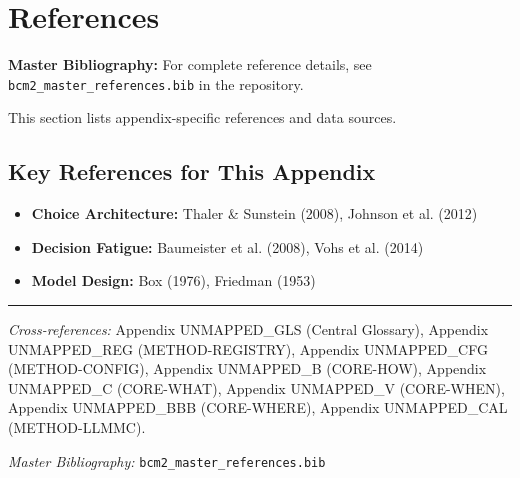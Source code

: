 \section{References}
\label{sec:eee-references}

\begin{tcolorbox}[colback=blue!5!white, colframe=blue!75!black]
\textbf{Master Bibliography:} For complete reference details, see
\texttt{bcm2\_master\_references.bib} in the repository.

This section lists appendix-specific references and data sources.
\end{tcolorbox}

\vspace{0.5em}

\subsection{Key References for This Appendix}

\begin{itemize}[nosep]
    \item \textbf{Choice Architecture:} Thaler \& Sunstein (2008), Johnson et al. (2012)
    \item \textbf{Decision Fatigue:} Baumeister et al. (2008), Vohs et al. (2014)
    \item \textbf{Model Design:} Box (1976), Friedman (1953)
\end{itemize}

\nocite{bcm_master}



\vspace{1em}
\hrule
\vspace{0.5em}

\noindent\textit{Cross-references:}
Appendix UNMAPPED_GLS (Central Glossary),
Appendix UNMAPPED_REG (METHOD-REGISTRY),
Appendix UNMAPPED_CFG (METHOD-CONFIG),
Appendix UNMAPPED_B (CORE-HOW),
Appendix UNMAPPED_C (CORE-WHAT),
Appendix UNMAPPED_V (CORE-WHEN),
Appendix UNMAPPED_BBB (CORE-WHERE),
Appendix UNMAPPED_CAL (METHOD-LLMMC).

\noindent\textit{Master Bibliography:} \texttt{bcm2\_master\_references.bib}


